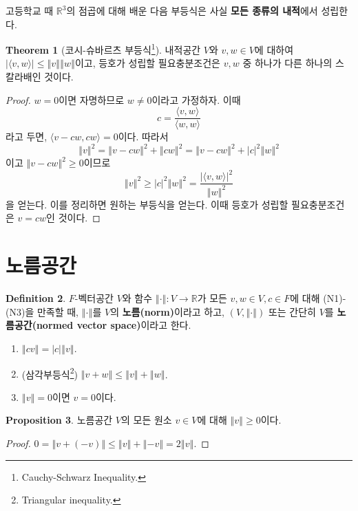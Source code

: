 \documentclass[11pt]{book}
\numberwithin{equation}{chapter}
\def\RR{\mathbb{R}}
\newcommand{\inner}[2]{\langle#1, #2\rangle}
\newcommand{\abs}[1]{\left\vert#1\right\vert}
\newcommand{\norm}[1]{\left\Vert#1\right\Vert}
\theoremstyle{definition}
\newtheorem{thm}{Theorem}[section]
\newtheorem{prop}[thm]{Proposition}
\newtheorem{defn}[thm]{Definition}
\begin{document}
고등학교 때 \(\RR^3\)의 점곱에 대해 배운 다음 부등식은 사실 \textbf{모든 종류의 내적}에서 성립한다.

\begin{thm} [코시-슈바르츠 부등식\footnote{Cauchy-Schwarz Inequality.}]
    내적공간 \(V\)와 \(v, w \in V\)에 대하여 \(\abs{\inner{v}{w}} \le \norm{v}\norm{w}\)이고, 등호가 성립할 필요충분조건은 \(v, w\) 중 하나가 다른 하나의 스칼라배인 것이다.
\end{thm}
\begin{proof}
    \(w = 0\)이면 자명하므로 \(w \ne 0\)이라고 가정하자. 이때
    \[
    c = \frac{\inner{v}{w}}{\inner{w}{w}}    
    \]
    라고 두면, \(\inner{v - cw}{cw} = 0\)이다. 따라서
    \[
    \norm{v}^2 = \norm{v - cw}^2 + \norm{cw}^2 = \norm{v - cw}^2 + \abs{c}^2 \norm{w}^2
    \]
    이고 \(\norm{v - cw}^2 \ge 0\)이므로
    \[
    \norm{v}^2 \ge \abs{c}^2 \norm{w}^2  = \frac{\abs{\inner{v}{w}}^2}{\norm{w}^2}
    \]
    을 얻는다. 이를 정리하면 원하는 부등식을 얻는다. 이때 등호가 성립할 필요충분조건은 \(v = cw\)인 것이다.
\end{proof}

\section{노름공간}

\begin{defn} \label{def 3.3.1}
    \(F\)-벡터공간 \(V\)와 함수 \(\norm{\cdot} : V \to \RR\)가 모든 \(v, w \in V, c \in F\)에 대해 (N1)-(N3)을 만족할 때, \(\norm{\cdot}\)를 \(V\)의 \textbf{노름(norm)}이라고 하고, \((V, \norm{\cdot})\) 또는 간단히 \(V\)를 \textbf{노름공간(normed vector space)}이라고 한다.
    \begin{enumerate} [label=(N\arabic*), leftmargin=2\parindent]
        \item \(\norm{cv} = \abs{c}\norm{v}\).
        \item (삼각부등식\footnote{Triangular inequality.}) \(\norm{v + w} \le \norm{v} + \norm{w}\).
        \item \(\norm{v} = 0\)이면 \(v = 0\)이다.
    \end{enumerate}
\end{defn}

\begin{prop}
    노름공간 \(V\)의 모든 원소 \(v \in V\)에 대해 \(\norm{v} \ge 0\)이다.
\end{prop}
\begin{proof}
    \(0 = \norm{v + (-v)} \le \norm{v} + \norm{-v} = 2\norm{v}\).
\end{proof}
\end{document}
